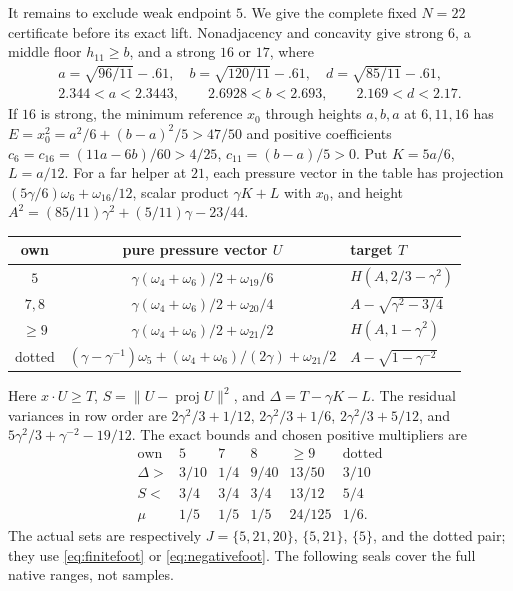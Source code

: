 \documentclass[11pt]{article}
\theoremstyle{remark}
\begin{document}
It remains to exclude weak endpoint $5$. We give the complete fixed
$N=22$ certificate before its exact lift. Nonadjacency and concavity
give strong $6$, a middle floor $h_{11}\ge b$, and a strong $16$
or $17$, where
\[
\begin{gathered}
 a=\sqrt{96/11}-.61,\quad b=\sqrt{120/11}-.61,\quad
 d=\sqrt{85/11}-.61,\\
 2.344<a<2.3443,\qquad 2.6928<b<2.693,\qquad 2.169<d<2.17.
\end{gathered}
\]
If $16$ is strong, the minimum reference $x_0$ through heights
$a,b,a$ at $6,11,16$ has
$E=x_0^2=a^2/6+(b-a)^2/5>47/50$ and positive coefficients
$c_6=c_{16}=(11a-6b)/60>4/25$, $c_{11}=(b-a)/5>0$.
Put $K=5a/6$, $L=a/12$. For a far helper at $21$, each pressure
vector in the table has projection
$(5\gamma/6)\omega_6+\omega_{16}/12$, scalar product
$\gamma K+L$ with $x_0$, and height
$A^2=(85/11)\gamma^2+(5/11)\gamma-23/44$.
\begin{center}\small
\begin{tabular}{ccl}
\toprule
own&pure pressure vector $U$&target $T$\\ \midrule
$5$&$\gamma(\omega_4+\omega_6)/2+\omega_{19}/6$
 &$H(A,2/3-\gamma^2)$\\
$7,8$&$\gamma(\omega_4+\omega_6)/2+\omega_{20}/4$
 &$A-\sqrt{\gamma^2-3/4}$\\
$\ge9$&$\gamma(\omega_4+\omega_6)/2+\omega_{21}/2$
 &$H(A,1-\gamma^2)$\\
dotted&$(\gamma-\gamma^{-1})\omega_5+
 (\omega_4+\omega_6)/(2\gamma)+\omega_{21}/2$
 &$A-\sqrt{1-\gamma^{-2}}$\\ \bottomrule
\end{tabular}\end{center}
Here $x\cdot U\ge T$, $S=\|U-\operatorname{proj}U\|^2$,
and $\Delta=T-\gamma K-L$. The residual variances in row order are
$2\gamma^2/3+1/12$, $2\gamma^2/3+1/6$,
$2\gamma^2/3+5/12$, and $5\gamma^2/3+\gamma^{-2}-19/12$.
The exact bounds and chosen positive multipliers are
\[
\begin{array}{c|ccccc}
\text{own}&5&7&8&\ge9&\text{dotted}\\ \hline
\Delta>&3/10&1/4&9/40&13/50&3/10\\
S<&3/4&3/4&3/4&13/12&5/4\\
\mu&1/5&1/5&1/5&24/125&1/6.
\end{array}
\]
The actual sets are respectively
$J=\{5,21,20\}$, $\{5,21\}$, $\{5\}$, and the dotted pair;
they use \eqref{eq:finitefoot} or \eqref{eq:negativefoot}.
The following seals cover the full native ranges, not samples.
\end{document}
